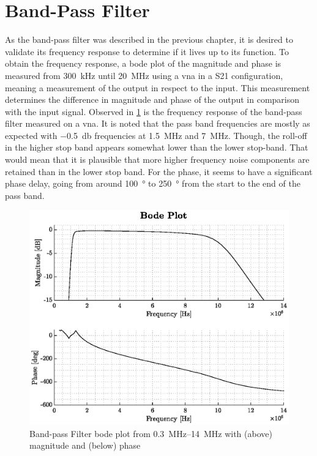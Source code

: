 \section{Band-Pass Filter}
As the band-pass filter was described in the previous chapter, it is desired to validate its frequency response to determine if it lives up to its function. To obtain the frequency response, a bode plot of the magnitude and phase is measured from \qty{300}{\kilo\hertz} until \qty{20}{\mega\hertz} using a \gls{vna} in a S21 configuration, meaning a measurement of the output in respect to the input. This measurement determines the difference in magnitude and phase of the output in comparison with the input signal. Observed in \cref{fig:4_bpf_measurement} is the frequency response of the band-pass filter measured on a \gls{vna}. It is noted that the pass band frequencies are mostly as expected with \qty{-0.5}{\decibel} frequencies at \qty{1.5}{\mega\hertz} and \qty{7}{\mega\hertz}. Though, the roll-off in the higher stop band appears somewhat lower than the lower stop-band. That would mean that it is plausible that more higher frequency noise components are retained than in the lower stop band. For the phase, it seems to have a significant phase delay, going from around \qty{100}{\degree} to \qty{250}{\degree} from the start to the end of the pass band.
\begin{figure}[htbp]
	\centering
	\includegraphics[width=.8\textwidth]{Figures/4_bpf_measurement_vna.eps}
	\caption[Band-pass filter bode plot]{Band-pass Filter bode plot from \qtyrange{0.3}{14}{\mega\hertz} with (above) magnitude and (below) phase}
	\label{fig:4_bpf_measurement}
\end{figure}

